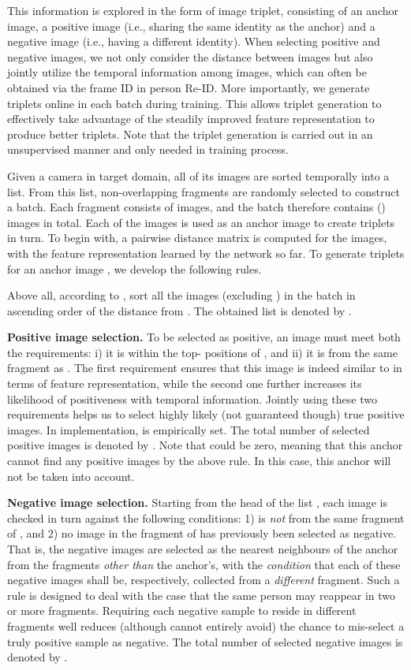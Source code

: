 \documentclass[10pt,twocolumn,letterpaper]{article}
\begin{document}
This information is explored in the form of image triplet, consisting of an anchor image, a positive image (i.e., sharing the same identity as the anchor) and a negative image (i.e., having a different identity). When selecting positive and negative images, we not only consider the distance between images but also jointly utilize the temporal information among images, which can often be obtained via the frame ID in person Re-ID.
More importantly, we generate triplets online in each batch during training. This allows triplet generation to effectively take advantage of the steadily improved feature representation to produce better triplets.
Note that the triplet generation is carried out in an unsupervised manner and only needed in training process. 
 
Given a camera in target domain, all of its images are sorted temporally into a list. From this list,  non-overlapping fragments are randomly selected to construct a batch. Each fragment consists of  images, and the batch therefore contains  () images in total. Each of the  images is used as an anchor image to create triplets in turn. 
To begin with, a pairwise distance matrix  is computed for the  images, with the feature representation learned by the network so far. To generate triplets for an anchor image , we develop the following rules.


Above all, according to , sort all the  images (excluding ) in the batch in ascending order of the distance from . The obtained list is denoted by .

\textbf{Positive image selection.} To be selected as positive, an image must meet both the requirements: i) it is within the top- positions of , {and} ii) it is from the same fragment as . The first requirement ensures that this image is indeed similar to  in terms of feature representation, while the second one further increases its likelihood of positiveness with temporal information. Jointly using these two requirements helps us to select highly likely (not guaranteed though) true positive images. In implementation,  is empirically set. The total number of selected positive images is denoted by . Note that  could be zero, meaning that this anchor cannot find any positive images by the above rule. In this case, this anchor will not be taken into account. 
 
 
 


 
\textbf{Negative image selection.} Starting from the head of the list , each image  is checked in turn against the following conditions: 1)  is \textit{not} from the same fragment of , and 2) no image in the fragment of  has previously been selected as negative. That is, the negative images are selected as the nearest neighbours of the anchor from the fragments \textit{other than} the anchor's, with the \textit{condition} that each of these negative images shall be, respectively, collected from a \textit{different} fragment. Such a rule is designed to deal with the case that the same person may reappear in two or more fragments. Requiring each negative sample to reside in different fragments well reduces (although cannot entirely avoid) the chance to mis-select a truly positive sample as negative. The total number of selected negative images is denoted by . 
 
\end{document}
